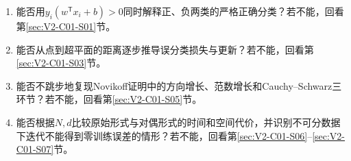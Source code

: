 \begin{SLCompactClosure}
\label{struct:V2-C01-CH36}

\label{struct:V2-C01-CH37}
\begin{selfcheckbox}
\begin{enumerate}[leftmargin=2.2em]
  \item 能否用$y_i(w^{\mathsf T}x_i+b)>0$同时解释正、负两类的严格正确分类？若不能，回看第\ref{sec:V2-C01-S01}节。
  \item 能否从点到超平面的距离逐步推导误分类损失与更新？若不能，回看第\ref{sec:V2-C01-S03}节。
  \item 能否不跳步地复现Novikoff证明中的方向增长、范数增长和Cauchy--Schwarz三环节？若不能，回看第\ref{sec:V2-C01-S05}节。
  \item 能否根据$N,d$比较原始形式与对偶形式的时间和空间代价，并识别不可分数据下迭代不能得到零训练误差的情形？若不能，回看第\ref{sec:V2-C01-S06}--\ref{sec:V2-C01-S07}节。
\end{enumerate}
\end{selfcheckbox}
\end{SLCompactClosure}
